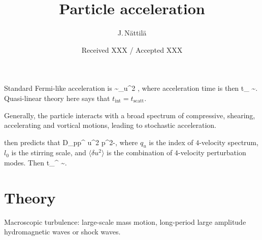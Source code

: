 \documentclass{aa}
\begin{document}
\title{Particle acceleration}

\author{J.\,N\"attil\"a}


\date{Received XXX / Accepted XXX}





\maketitle

\citep{birdsall1985}



Standard Fermi-like acceleration is
\be
\langle {} \rangle \sim \beta_u^2 ,
\ee
where acceleration time is then
\be
t_{} \sim {}.
\ee
Quasi-linear theory here says that $t_{\mathrm{int}} = t_{\mathrm{scatt}}$.

Generally, the particle interacts with a broad spectrum of compressive, shearing, accelerating and vortical motions, leading to stochastic acceleration.

\citealt{Lemoine_2019} then predicts that
\be
D_{pp}^{} \approx \langle \delta u^2 \rangle {} \propto p^{2-\epsilon},
\ee
where $q_u$ is the index of $4$-velocity spectrum, $l_0$ is the stirring scale, and $\langle \delta u^2 \rangle$ is the combination of $4$-velocity perturbation modes.
Then
\be
t_{}^{} \sim {}.
\ee



\section{Theory}\label{sect:theory}


Macroscopic turbulence:
large-scale mass motion, long-period large amplitude hydromagnetic waves or shock waves.
\end{document}
